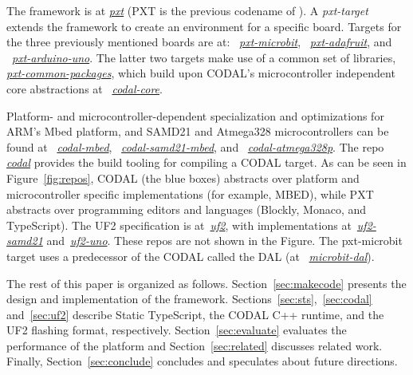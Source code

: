 The \MC framework 
is at \emph{\href{https://github.com/microsoft/pxt}{pxt}} (PXT is the previous codename of \MC). 
A \emph{pxt-target} extends the framework to create an environment for a specific board. Targets
for the three previously mentioned boards are at: 
~\emph{\href{https://github.com/microsoft/pxt-microbit}{pxt-microbit}}, 
~\emph{\href{https://github.com/microsoft/pxt-adafruit}{pxt-adafruit}}, and
~\emph{\href{https://github.com/microsoft/pxt-arduino-uno}{pxt-arduino-uno}}.
The latter two targets make use of a common set of libraries, 
\emph{\href{https://github.com/microsoft/pxt-common-packages}{pxt-common-packages}},
which build upon CODAL's microcontroller independent core abstractions at
~\emph{\href{https://github.com/lancaster-university/codal-core}{codal-core}}.  

Platform- and microcontroller-dependent specialization and optimizations for ARM's Mbed platform, 
and SAMD21 and Atmega328 microcontrollers can be found at
~\emph{\href{https://github.com/lancaster-university/codal-mbed}{codal-mbed}},
\linebreak
~\emph{\href{https://github.com/lancaster-university/codal-samd21-mbed}{codal-samd21-mbed}}, 
and
~\emph{\href{https://github.com/lancaster-university/codal-atmega328p}{codal-atmega328p}}.
The repo \emph{\href{https://github.com/lancaster-university/codal}{codal}} provides the
build tooling for compiling a CODAL target.  As can be seen in Figure~\ref{fig:repos}, 
CODAL (the blue boxes) abstracts over platform and microcontroller specific
implementations (for example, MBED), while PXT abstracts over programming editors
and languages (Blockly, Monaco, and TypeScript).
The UF2 specification is at~\emph{\href{https://github.com/microsoft/uf2}{uf2}},
with implementations at~\emph{\href{https://github.com/microsoft/uf2-samd21}{uf2-samd21}}
and~\emph{\href{https://github.com/mmoskal/uf2-uno}{uf2-uno}}. These repos are not
shown in the Figure. 
The pxt-microbit target uses a predecessor of the CODAL called the DAL (at
~\emph{\href{https://github.com/lancaster-university/microbit-dal}{microbit-dal}}).

The rest of this paper is organized as follows. Section~\ref{sec:makecode} presents the design and implementation of the \MC framework. 
Sections~\ref{sec:sts},~\ref{sec:codal} and~\ref{sec:uf2} describe Static TypeScript, the CODAL C++ runtime, and the UF2 flashing format,
respectively.  Section~\ref{sec:evaluate} evaluates the performance of the platform and
Section~\ref{sec:related} discusses related work. Finally, Section~\ref{sec:conclude} concludes and speculates about future directions. 
